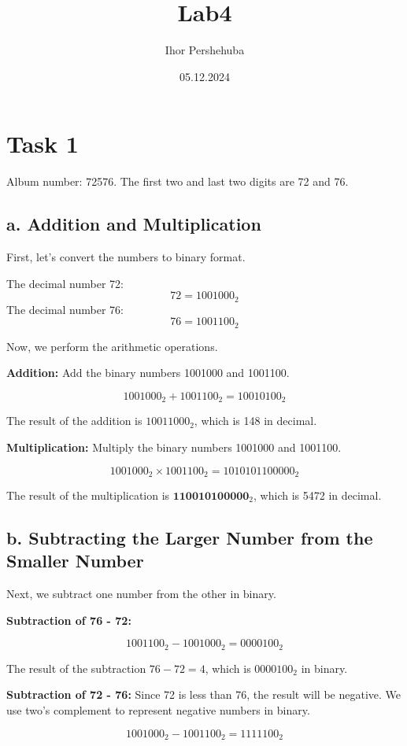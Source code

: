 \documentclass{article}
\title{Lab4}
\author{Ihor Pershehuba}
\date{05.12.2024}
\begin{document}
\maketitle

\section*{Task 1}

Album number: 72576. The first two and last two digits are 72 and 76.

\subsection*{a. Addition and Multiplication}

First, let's convert the numbers to binary format.

The decimal number 72:
\[
72 = 1001000_2
\]
The decimal number 76:
\[
76 = 1001100_2
\]

Now, we perform the arithmetic operations.

\textbf{Addition:} Add the binary numbers 1001000 and 1001100.

\[
1001000_2 + 1001100_2 = 10010100_2
\]

The result of the addition is \( 10011000_2 \), which is 148 in decimal.

\textbf{Multiplication:} Multiply the binary numbers 1001000 and 1001100.

\[
1001000_2 \times 1001100_2 = 1010101100000_2
\]

The result of the multiplication is \( \textbf{110010100000}_2 \), which is 5472 in decimal.

\subsection*{b. Subtracting the Larger Number from the Smaller Number}

Next, we subtract one number from the other in binary.

\textbf{Subtraction of 76 - 72:}

\[
1001100_2 - 1001000_2 = 0000100_2
\]

The result of the subtraction \( 76 - 72 = 4 \), which is \( 0000100_2 \) in binary.

\textbf{Subtraction of 72 - 76:} Since 72 is less than 76, the result will be negative. We use two's complement to represent negative numbers in binary.

\[
1001000_2 - 1001100_2 = 1111100_2
\]
\end{document}
